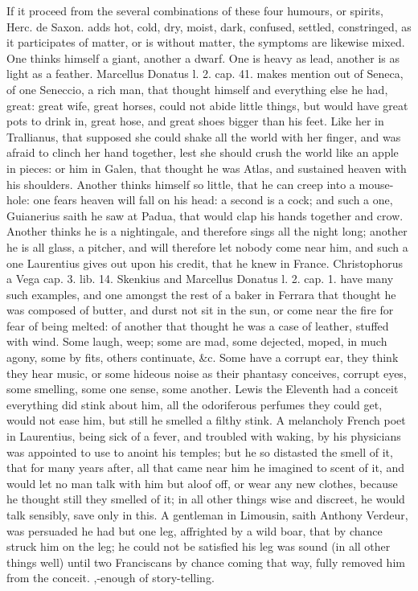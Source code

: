 {If it proceed from the several combinations of these four humours, or
spirits, Herc. de Saxon. adds hot, cold, dry, moist, dark, confused,
settled, constringed, as it participates of matter, or is without
matter, the symptoms are likewise mixed. One thinks himself a giant,
another a dwarf. One is heavy as lead, another is as light as a
feather. Marcellus Donatus l. 2. cap. 41. makes mention out of Seneca,
of one Seneccio, a rich man, that thought himself and everything
else he had, great: great wife, great horses, could not abide little
things, but would have great pots to drink in, great hose, and great
shoes bigger than his feet. Like her in Trallianus, that supposed
she could shake all the world with her finger, and was afraid to clinch
her hand together, lest she should crush the world like an apple in
pieces: or him in Galen, that thought he was Atlas, and sustained
heaven with his shoulders. Another thinks himself so little, that he
can creep into a mouse-hole: one fears heaven will fall on his head: a
second is a cock; and such a one, Guianerius saith he saw at
Padua, that would clap his hands together and crow. Another
thinks he is a nightingale, and therefore sings all the night long;
another he is all glass, a pitcher, and will therefore let nobody come
near him, and such a one Laurentius gives out upon his credit,
that he knew in France. Christophorus a Vega cap. 3. lib. 14. Skenkius
and Marcellus Donatus l. 2. cap. 1. have many such examples, and one
amongst the rest of a baker in Ferrara that thought he was composed of
butter, and durst not sit in the sun, or come near the fire for fear of
being melted: of another that thought he was a case of leather, stuffed
with wind. Some laugh, weep; some are mad, some dejected, moped, in
much agony, some by fits, others continuate, \&c. Some have a corrupt
ear, they think they hear music, or some hideous noise as their
phantasy conceives, corrupt eyes, some smelling, some one sense, some
another. Lewis the Eleventh had a conceit everything did stink
about him, all the odoriferous perfumes they could get, would not ease
him, but still he smelled a filthy stink. A melancholy French poet in
Laurentius, being sick of a fever, and troubled with waking, by
his physicians was appointed to use  to anoint his
temples; but he so distasted the smell of it, that for many years
after, all that came near him he imagined to scent of it, and would let
no man talk with him but aloof off, or wear any new clothes, because he
thought still they smelled of it; in all other things wise and
discreet, he would talk sensibly, save only in this. A gentleman in
Limousin, saith Anthony Verdeur, was persuaded he had but one leg,
affrighted by a wild boar, that by chance struck him on the leg; he
could not be satisfied his leg was sound (in all other things well)
until two Franciscans by chance coming that way, fully removed him from
the conceit. ,-enough of story-telling.

}
